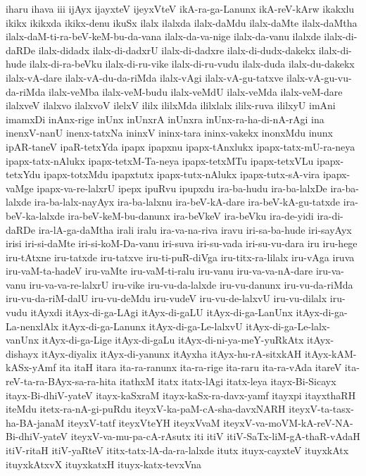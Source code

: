 {iharu
ihava
iii
ijAyx
ijayxteV
ijeyxVteV
ikA-ra-ga-Lanunx
ikA-reV-kArw
ikakxlu
ikikx
ikikxda
ikikx-denu
ikuSx
ilalx
ilalxda
ilalx-daMdu
ilalx-daMte
ilalx-daMtha
ilalx-daM-ti-ra-beV-keM-bu-da-vana
ilalx-da-va-nige
ilalx-da-vanu
ilalxde
ilalx-di-daRDe
ilalx-didadx
ilalx-di-dadxrU
ilalx-di-dadxre
ilalx-di-dudx-dakekx
ilalx-di-hude
ilalx-di-ra-beVku
ilalx-di-ru-vike
ilalx-di-ru-vudu
ilalx-duda
ilalx-du-dakekx
ilalx-vA-dare
ilalx-vA-du-da-riMda
ilalx-vAgi
ilalx-vA-gu-tatxve
ilalx-vA-gu-vu-da-riMda
ilalx-veMba
ilalx-veM-budu
ilalx-veMdU
ilalx-veMda
ilalx-veM-dare
ilalxveV
ilalxvo
ilalxvoV
ilelxV
ililx
ililxMda
ililxlalx
ililx-ruva
ililxyU
imAni
imamxDi
inAnx-rige
inUnx
inUnxrA
inUnxra
inUnx-ra-ha-di-nA-rAgi
ina
inenxV-nanU
inenx-tatxNa
ininxV
ininx-tara
ininx-vakekx
inonxMdu
inunx
ipAR-taneV
ipaR-tetxYda
ipapx
ipapxnu
ipapx-tAnxlukx
ipapx-tatx-mU-ra-neya
ipapx-tatx-nAlukx
ipapx-tetxM-Ta-neya
ipapx-tetxMTu
ipapx-tetxVLu
ipapx-tetxYdu
ipapx-totxMdu
ipapxtutx
ipapx-tutx-nAlukx
ipapx-tutx-sA-vira
ipapx-vaMge
ipapx-va-re-lalxrU
ipepx
ipuRvu
ipupxdu
ira-ba-hudu
ira-ba-lalxDe
ira-ba-lalxde
ira-ba-lalx-nayAyx
ira-ba-lalxnu
ira-beV-kA-dare
ira-beV-kA-gu-tatxde
ira-beV-ka-lalxde
ira-beV-keM-bu-danunx
ira-beVkeV
ira-beVku
ira-de-yidi
ira-di-daRDe
ira-lA-ga-daMtha
irali
iralu
ira-va-na-riva
iravu
iri-sa-ba-hude
iri-sayAyx
irisi
iri-si-daMte
iri-si-koM-Da-vanu
iri-suva
iri-su-vada
iri-su-vu-dara
iru
iru-hege
iru-tAtxne
iru-tatxde
iru-tatxve
iru-ti-puR-diVga
iru-titx-ra-lilalx
iru-vAga
iruva
iru-vaM-ta-hadeV
iru-vaMte
iru-vaM-ti-ralu
iru-vanu
iru-va-va-nA-dare
iru-va-vanu
iru-va-va-re-lalxrU
iru-vike
iru-vu-da-lalxde
iru-vu-danunx
iru-vu-da-riMda
iru-vu-da-riM-dalU
iru-vu-deMdu
iru-vudeV
iru-vu-de-lalxvU
iru-vu-dilalx
iru-vudu
itAyxdi
itAyx-di-ga-LAgi
itAyx-di-gaLU
itAyx-di-ga-LanUnx
itAyx-di-ga-La-nenxlAlx
itAyx-di-ga-Lanunx
itAyx-di-ga-Le-lalxvU
itAyx-di-ga-Le-lalx-vanUnx
itAyx-di-ga-Lige
itAyx-di-gaLu
itAyx-di-ni-ya-meY-yuRkAtx
itAyx-dishayx
itAyx-diyalix
itAyx-di-yanunx
itAyxha
itAyx-hu-rA-sitxkAH
itAyx-kAM-kASx-yAmf
ita
itaH
itara
ita-ra-ranunx
ita-ra-rige
ita-raru
ita-ra-vAda
itareV
ita-reV-ta-ra-BAyx-sa-ra-hita
itathxM
itatx
itatx-lAgi
itatx-leya
itayx-Bi-Sicayx
itayx-Bi-dhiV-yateV
itayx-kaSxraM
itayx-kaSx-ra-davx-yamf
itayxpi
itayxthaRH
iteMdu
itetx-ra-nA-gi-puRdu
iteyxV-ka-paM-cA-sha-davxNARH
iteyxV-ta-tasx-ha-BA-janaM
iteyxV-tatf
iteyxVteYH
iteyxVvaM
iteyxV-va-moVM-kA-reV-NA-Bi-dhiV-yateV
iteyxV-va-mu-pa-cA-rAsutx
iti
itiV
itiV-SaTx-liM-gA-thaR-vAdaH
itiV-ritaH
itiV-yaRteV
ititx-tatx-lA-da-ra-lalxde
itutx
ituyx-cayxteV
ituyxkAtx
ituyxkAtxvX
ituyxkatxH
ituyx-katx-tevxVna
}

